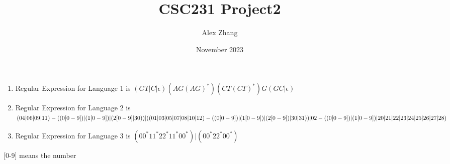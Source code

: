 \documentclass{article}
\title{CSC231 Project2}
\author{Alex Zhang}
\date{November 2023}
\begin{document}
\maketitle
\begin{enumerate}
    \item Regular Expression for Language 1 is $(GT|C|\epsilon)(AG(AG)^*)(CT(CT)^*)G(GC|\epsilon)$
    \item Regular Expression for Language 2 is $(04|06|09|11)-((0[0-9])|(1[0-9])|(2[0-9]|30))\\
    |((01|03|05|07|08|10|12)-((0[0-9])|(1[0-9])|(2[0-9])|30|31))\\
    |02-((0[0-9])|(1[0-9])|20|21|22|23|24|25|26|27|28)$
    \item Regular Expression for Language 3 is $(00^*11^*22^*11^*00^*)|(00^*22^*00^*)$
\end{enumerate}
[0-9] means the number 
\end{document}
